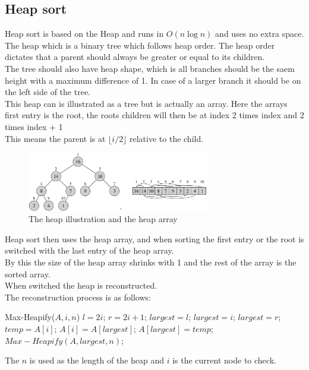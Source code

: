 \documentclass[12pt, a4paper]{article}
\begin{document}
			\subsection{Heap sort}
				Heap sort is based on the Heap and runs in $O(n\log n)$ and uses no extra space. The heap which is a binary tree which follows heap order. The heap order dictates that a parent should always be greater or equal to its children. \\
				The tree should also have heap shape, which is all branches should be the saem height with a maximum difference of 1. In case of a larger branch it should be on the left side of the tree.\\
				This heap can is illustrated as a tree but is actually an array. Here the arrays first entry is the root, the roots children will then be at index 2 times index and 2 times index + 1\\
				This means the parent is at $\lfloor i/2 \rfloor$ relative to the child.
				\begin{figure}[h!]
					\includegraphics[width=300px]{assets/heapAsArray.png}
					\center
					\caption{The heap illustration and the heap array}
				\end{figure}
				Heap sort then uses the heap array, and when sorting the first entry or the root is switched with the last entry of the heap array.\\
				By this the size of the heap array shrinks with 1 and the rest of the array is the sorted array.\\
				When switched the heap is reconstructed.\\
				The reconstruction process is as follows:
				\begin{algorithmic}[1]
					\State Max-Heapify($A,i,n$)
					\State $l = 2i$;
					\State $r =2i+1$;
						\State $largest = l$;
					\Else
						\State $largest = i$;
					\EndIf
						\State $largest = r$;
					\EndIf
						\State $temp = A[i]$;
						\State $A[i] = A[largest]$;
						\State $A[largest] = temp$;
						\State $Max-Heapify(A,largest,n)$;
					\EndIf
				\end{algorithmic}
				The $n$ is used as the length of the heap and $i$ is the current node to check.\\
\end{document}
